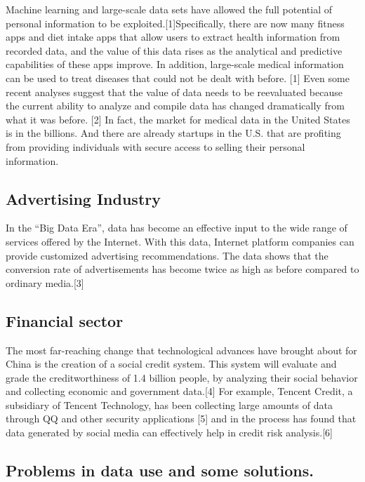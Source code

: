 \documentclass[
]{article}
\begin{document}
Machine learning and large-scale data sets have allowed the full
potential of personal information to be exploited.{[}1{]}Specifically,
there are now many fitness apps and diet intake apps that allow users to
extract health information from recorded data, and the value of this
data rises as the analytical and predictive capabilities of these apps
improve. In addition, large-scale medical information can be used to
treat diseases that could not be dealt with before. {[}1{]} Even some
recent analyses suggest that the value of data needs to be reevaluated
because the current ability to analyze and compile data has changed
dramatically from what it was before. {[}2{]} In fact, the market for
medical data in the United States is in the billions. And there are
already startups in the U.S. that are profiting from providing
individuals with secure access to selling their personal information.

\hypertarget{advertising-industry}{%
\subsection{Advertising Industry}\label{advertising-industry}}

In the ``Big Data Era'', data has become an effective input to the wide
range of services offered by the Internet. With this data, Internet
platform companies can provide customized advertising recommendations.
The data shows that the conversion rate of advertisements has become
twice as high as before compared to ordinary media.{[}3{]}

\hypertarget{financial-sector}{%
\subsection{Financial sector}\label{financial-sector}}

The most far-reaching change that technological advances have brought
about for China is the creation of a social credit system. This system
will evaluate and grade the creditworthiness of 1.4 billion people, by
analyzing their social behavior and collecting economic and government
data.{[}4{]} For example, Tencent Credit, a subsidiary of Tencent
Technology, has been collecting large amounts of data through QQ and
other security applications {[}5{]} and in the process has found that
data generated by social media can effectively help in credit risk
analysis.{[}6{]}

\hypertarget{problems-in-data-use-and-some-solutions.}{%
\subsection{Problems in data use and some
solutions.}\label{problems-in-data-use-and-some-solutions.}}
\end{document}

